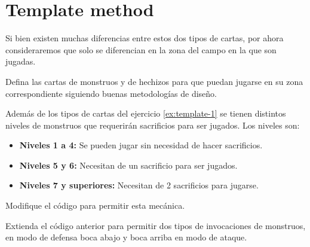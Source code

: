 \section{Template method}
  \begin{Exercise}[title={Zonas de juego}, label={ex:template-1}, difficulty=1]
    Si bien existen muchas diferencias entre estos dos tipos de cartas, por ahora 
    consideraremos que solo se diferencian en la zona del campo en la que son jugadas.

    Defina las cartas de monstruos y de hechizos para que puedan jugarse en su zona 
    correspondiente siguiendo buenas metodologías de diseño.
  \end{Exercise}

  \begin{Exercise}[
      title={Niveles de monstruos}, 
      label={ex:template-2}, 
      difficulty=1
    ]
    Además de los tipos de cartas del ejercicio \ref{ex:template-1} se tienen distintos 
    niveles de monstruos que requerirán sacrificios para ser jugados.
    Los niveles son:
    \begin{itemize}
      \item \textbf{Niveles 1 a 4:} Se pueden jugar sin necesidad de hacer sacrificios.
      \item \textbf{Niveles 5 y 6:} Necesitan de un sacrificio para ser jugados.
      \item \textbf{Niveles 7 y superiores:} Necesitan de 2 sacrificios para jugarse.  
    \end{itemize}

    Modifique el código para permitir esta mecánica.
  \end{Exercise}

  \begin{Exercise}[
      title={Invocaciones de monstruos (Propuesto)}, 
      label={ex:template-3}, 
      difficulty=2
    ]
    Extienda el código anterior para permitir dos tipos de invocaciones de monstruos, en
    modo de defensa boca abajo y boca arriba en modo de ataque.
  \end{Exercise}
% 